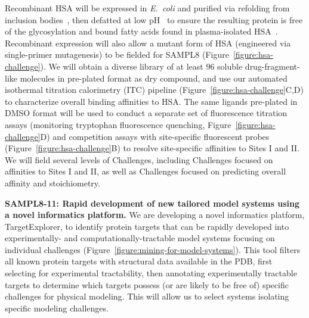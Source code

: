\documentclass[11pt]{article}
\begin{document}
Recombinant HSA will be expressed in \emph{E.~coli} and purified via refolding from inclusion bodies~\cite{Latta:1987:Bio/Technology}, then defatted at low pH~\cite{Lang:2015:BiotechnologyProgress} to ensure the resulting protein is free of the glycosylation and bound fatty acids found in plasma-isolated HSA~\cite{Lang:2015:BiotechnologyProgress}.
Recombinant expression will also allow a mutant form of HSA (engineered via single-primer mutagenesis) to be fielded for SAMPL8 (Figure~\ref{figure:hsa-challenge}).
We will obtain a diverse library of at least 96 soluble drug-fragment-like molecules in pre-plated format as dry compound, and use our automated isothermal titration calorimetry (ITC) pipeline (Figure~\ref{figure:hsa-challenge}C,D) to characterize overall binding affinities to HSA.
The same ligands pre-plated in DMSO format will be used to conduct a separate set of fluorescence titration assays (monitoring tryptophan fluorescence quenching, Figure~\ref{figure:hsa-challenge}D) and competition assays with site-specific fluorescent probes (Figure~\ref{figure:hsa-challenge}B) to resolve site-specific affinities to Sites I and II.
We will field several levels of Challenges, including Challenges focused on affinities to Sites I and II, as well as Challenges focused on predicting overall affinity and stoichiometry.

\textbf{SAMPL8-11: Rapid development of new tailored model systems using a novel informatics platform.} We are developing a novel informatics platform, TargetExplorer, to identify protein targets that can be rapidly developed into experimentally- and computationally-tractable model systems focusing on individual challenges (Figure~\ref{figure:mining-for-model-systems}).
This tool filters all known protein targets with structural data available in the PDB, first selecting for experimental tractability, then annotating experimentally tractable targets to determine which targets possess (or are likely to be free of) specific challenges for physical modeling.
This will allow us to select systems isolating specific modeling challenges.
\end{document}
